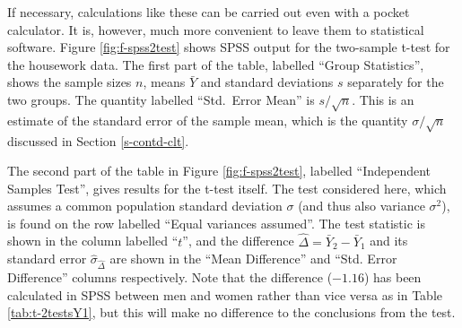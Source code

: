\documentclass[11pt,a4paper,openany]{book}
\begin{document}
\label{p-spss2a} If necessary, calculations like these can be carried
out even with a pocket calculator. It is, however, much more convenient
to leave them to statistical software. Figure \ref{fig:f-spss2test}
shows SPSS output for the two-sample t-test for the housework data. The
first part of the table, labelled ``Group Statistics'', shows the sample
sizes \(n\), means \(\bar{Y}\) and standard deviations \(s\) separately
for the two groups. The quantity labelled ``Std.~Error Mean'' is
\(s/\sqrt{n}\). This is an estimate of the standard error of the sample
mean, which is the quantity \(\sigma/\sqrt{n}\) discussed in Section
\ref{s-contd-clt}.

The second part of the table in Figure \ref{fig:f-spss2test}, labelled
``Independent Samples Test'', gives results for the t-test itself. The
test considered here, which assumes a common population standard
deviation \(\sigma\) (and thus also variance \(\sigma^{2}\)), is found
on the row labelled ``Equal variances assumed''. The test statistic is
shown in the column labelled ``\(t\)'', and the difference
\(\hat{\Delta}=\bar{Y}_{2}-\bar{Y}_{1}\) and its standard error
\(\hat{\sigma}_{\hat{\Delta}}\) are shown in the ``Mean Difference'' and
``Std. Error Difference'' columns respectively. Note that the difference
(\(-1.16\)) has been calculated in SPSS between men and women rather
than vice versa as in Table \ref{tab:t-2testsY1}, but this will make no
difference to the conclusions from the test.
\end{document}
